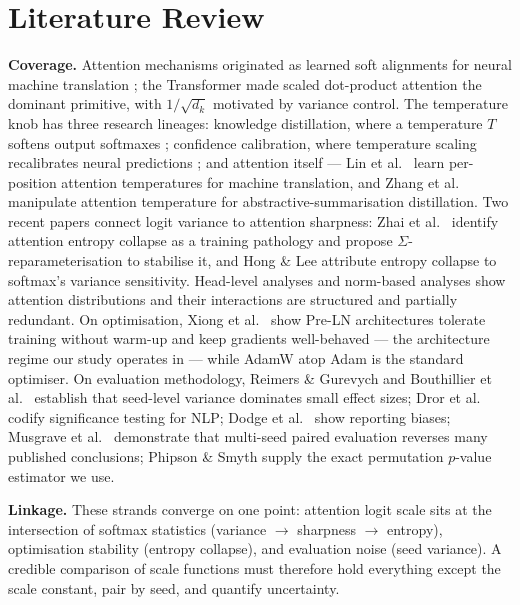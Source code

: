 \documentclass[11pt,a4paper]{article}
\begin{document}
\section{Literature Review}

\textbf{Coverage.} Attention mechanisms originated as learned soft alignments for neural machine translation \cite{bahdanau2015,luong2015}; the Transformer \cite{vaswani2017} made scaled dot-product attention the dominant primitive, with $1/\sqrt{d_k}$ motivated by variance control. The temperature knob has three research lineages: knowledge distillation, where a temperature $T$ softens output softmaxes \cite{hinton2015}; confidence calibration, where temperature scaling recalibrates neural predictions \cite{guo2017}; and attention itself --- Lin et al.~\cite{lin2018} learn per-position attention temperatures for machine translation, and Zhang et al.~\cite{zhang2022} manipulate attention temperature for abstractive-summarisation distillation. Two recent papers connect logit variance to attention sharpness: Zhai et al.~\cite{zhai2023} identify attention entropy collapse as a training pathology and propose $\Sigma$-reparameterisation to stabilise it, and Hong \& Lee \cite{hong2025} attribute entropy collapse to softmax's variance sensitivity. Head-level analyses \cite{michel2019,voita2019} and norm-based analyses \cite{kobayashi2020} show attention distributions and their interactions are structured and partially redundant. On optimisation, Xiong et al.~\cite{xiong2020} show Pre-LN architectures tolerate training without warm-up and keep gradients well-behaved --- the architecture regime our study operates in --- while AdamW \cite{loshchilov2019} atop Adam \cite{kingma2015} is the standard optimiser. On evaluation methodology, Reimers \& Gurevych \cite{refreimers2017} and Bouthillier et al.~\cite{bouthillier2021} establish that seed-level variance dominates small effect sizes; Dror et al.~\cite{dror2018} codify significance testing for NLP; Dodge et al.~\cite{dodge2019} show reporting biases; Musgrave et al.~\cite{musgrave2020} demonstrate that multi-seed paired evaluation reverses many published conclusions; Phipson \& Smyth \cite{phipson2010} supply the exact permutation $p$-value estimator we use.

\textbf{Linkage.} These strands converge on one point: attention logit scale sits at the intersection of softmax statistics (variance $\rightarrow$ sharpness $\rightarrow$ entropy), optimisation stability (entropy collapse), and evaluation noise (seed variance). A credible comparison of scale functions must therefore hold everything except the scale constant, pair by seed, and quantify uncertainty.
\end{document}
